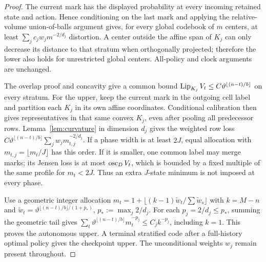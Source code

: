 \begin{proof}
The current mark has the displayed probability at every incoming retained state and action. Hence conditioning on the last mark and applying the relative-volume union-of-balls argument gives, for every global codebook of $m$ centers, at least
$\sum_j c_jw_jm^{-2/d_j}$ distortion. A center outside the affine span of $K_j$ can only decrease its distance to that stratum when orthogonally projected; therefore the lower also holds for unrestricted global centers. All-policy and clock arguments are unchanged.

The overlap proof and concavity give a common bound
$\operatorname{Lip}_{K_j}V_t\le C\vartheta^{\lfloor(n-t)/b\rfloor}$ on every stratum. For the upper, keep the current mark in the outgoing cell label and partition each $K_j$ in its own affine coordinates. Conditional calibration then gives representatives in that same convex $K_j$, even after pooling all predecessor rows. Lemma~\ref{lem:curvature} in dimension $d_j$ gives the weighted row loss $C\vartheta^{\lfloor(n-t)/b\rfloor}\sum_jw_jm_{t,j}^{-2/d_j}$. If a phase width is at least $2J$, equal allocation with $m_{t,j}=\lfloor m_t/J\rfloor$ has this order. If it is smaller, one common label may merge marks; its Jensen loss is at most $\operatorname{osc}_DV_t$, which is bounded by a fixed multiple of the same profile for $m_t<2J$. Thus an extra $J$-state minimum is not imposed at every phase.

Use a geometric integer allocation $m_t=1+\lfloor(k-1)\widetilde w_t/\sum\widetilde w_s\rfloor$ with $k=M-n$ and $\widetilde w_t=\vartheta^{\lfloor(n-t)/b\rfloor/(1+p_*)}$, $p_*:=\max_j2/d_j$. For each $p_j=2/d_j\le p_*$, summing the geometric tail gives $\sum_t\vartheta^{\lfloor(n-t)/b\rfloor}m_t^{-p_j}\le C_jk^{-p_j}$, including $k=1$. This proves the autonomous upper. A terminal stratified code after a full-history optimal policy gives the checkpoint upper. The unconditional weights $w_j$ remain present throughout.
\end{proof}

